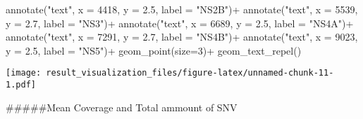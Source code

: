 \documentclass[
]{article}
\newenvironment{Shaded}{\begin{snugshade}}{\end{snugshade}}
\newcommand{\AttributeTok}[1]{\textcolor[rgb]{0.77,0.63,0.00}{#1}}
\newcommand{\DecValTok}[1]{\textcolor[rgb]{0.00,0.00,0.81}{#1}}
\newcommand{\FloatTok}[1]{\textcolor[rgb]{0.00,0.00,0.81}{#1}}
\newcommand{\FunctionTok}[1]{\textcolor[rgb]{0.00,0.00,0.00}{#1}}
\newcommand{\NormalTok}[1]{#1}
\newcommand{\SpecialCharTok}[1]{\textcolor[rgb]{0.00,0.00,0.00}{#1}}
\newcommand{\StringTok}[1]{\textcolor[rgb]{0.31,0.60,0.02}{#1}}
\begin{document}
\begin{Shaded}
\begin{Highlighting}[]
  \FunctionTok{annotate}\NormalTok{(}\StringTok{"text"}\NormalTok{, }\AttributeTok{x =} \DecValTok{4418}\NormalTok{, }\AttributeTok{y =} \FloatTok{2.5}\NormalTok{, }\AttributeTok{label =} \StringTok{"NS2B"}\NormalTok{)}\SpecialCharTok{+}
  \FunctionTok{annotate}\NormalTok{(}\StringTok{"text"}\NormalTok{, }\AttributeTok{x =} \DecValTok{5539}\NormalTok{, }\AttributeTok{y =} \FloatTok{2.7}\NormalTok{, }\AttributeTok{label =} \StringTok{"NS3"}\NormalTok{)}\SpecialCharTok{+}
  \FunctionTok{annotate}\NormalTok{(}\StringTok{"text"}\NormalTok{, }\AttributeTok{x =} \DecValTok{6689}\NormalTok{, }\AttributeTok{y =} \FloatTok{2.5}\NormalTok{, }\AttributeTok{label =} \StringTok{"NS4A"}\NormalTok{)}\SpecialCharTok{+}
  \FunctionTok{annotate}\NormalTok{(}\StringTok{"text"}\NormalTok{, }\AttributeTok{x =} \DecValTok{7291}\NormalTok{, }\AttributeTok{y =} \FloatTok{2.7}\NormalTok{, }\AttributeTok{label =} \StringTok{"NS4B"}\NormalTok{)}\SpecialCharTok{+}
  \FunctionTok{annotate}\NormalTok{(}\StringTok{"text"}\NormalTok{, }\AttributeTok{x =} \DecValTok{9023}\NormalTok{, }\AttributeTok{y =} \FloatTok{2.5}\NormalTok{, }\AttributeTok{label =} \StringTok{"NS5"}\NormalTok{)}\SpecialCharTok{+}
  \FunctionTok{geom\_point}\NormalTok{(}\AttributeTok{size=}\DecValTok{3}\NormalTok{)}\SpecialCharTok{+}
  \FunctionTok{geom\_text\_repel}\NormalTok{()}
\end{Highlighting}
\end{Shaded}

\texttt{[image: result\_visualization\_files/figure-latex/unnamed-chunk-11-1.pdf]}

\#\#\#\#\#Mean Coverage and Total ammount of SNV
\end{document}
